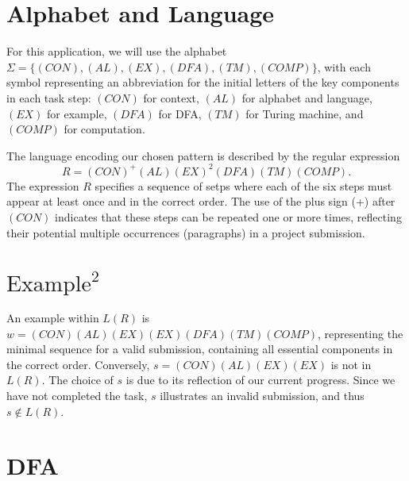\documentclass{article}
\begin{document}
\section*{Alphabet and Language}

For this application, we will use the alphabet $\Sigma = \{(CON), (AL), (EX), (DFA), (TM),
(COMP)\}$, with each symbol representing an abbreviation for the initial letters of the key
components in each task step: $(CON)$ for context, $(AL)$ for alphabet and language, $(EX)$ for
example, $(DFA)$ for DFA, $(TM)$ for Turing machine, and $(COMP)$ for computation.

The language encoding our chosen pattern is described by the regular expression
\[
  R = (CON)^+(AL)(EX)^2(DFA)(TM)(COMP).
\]
The expression $R$ specifies a sequence of setps where each of the six steps must appear at least
once and in the correct order. The use of the plus sign (+) after $(CON)$ indicates that these steps
can be repeated one or more times, reflecting their potential multiple occurrences (paragraphs) in a
project submission. 

\section*{$\text{Example}^2$}

An example within $L(R)$ is $w = (CON)(AL)(EX)(EX)(DFA)(TM)(COMP)$, representing the minimal
sequence for a valid submission, containing all essential components in the correct order.
Conversely, $s = (CON)(AL)(EX)(EX)$ is not in $L(R)$. The choice of $s$ is due to its reflection of
our current progress. Since we have not completed the task, $s$ illustrates an invalid submission,
and thus $s \notin L(R)$.
 
\section*{DFA}
\end{document}
